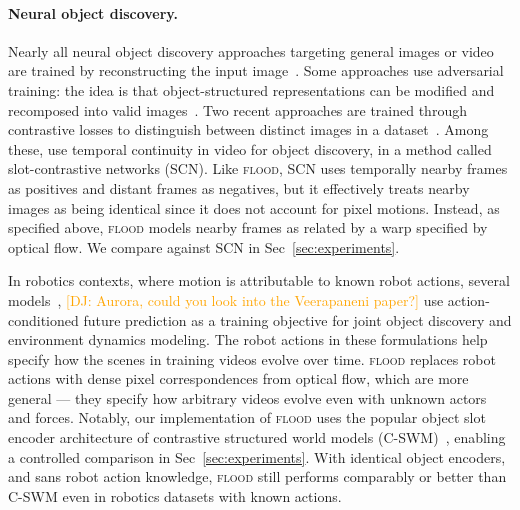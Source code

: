 \documentclass{article}
\newcommand{\jd}[1]{\textcolor{orange}{[DJ: #1]}}
\begin{document}


\paragraph{Neural object discovery.} Nearly all neural object discovery approaches targeting general images or video are trained by reconstructing the input image~\cite{jakab2018unsupervised,jakab2020self,greff2019multi, burgess2019monet,locatello2020object,Kulkarni2019UnsupervisedLO, minderer2019unsupervised, engelcke2019genesis}. Some approaches use adversarial training: the idea is that object-structured representations can be modified and recomposed into valid images~\cite{chen2019unsupervised, yang2020learning}. Two recent approaches are trained through contrastive losses to distinguish between distinct images in a dataset~\cite{racah2020slot,lowe2020learning}. Among these, \citet{racah2020slot} use temporal continuity in video for object discovery, in a method called slot-contrastive networks (SCN). Like \textsc{flood}, SCN uses temporally nearby frames as positives and distant frames as negatives, but it effectively treats nearby images as being identical since it does not account for pixel motions. Instead, as specified above, \textsc{flood} models nearby frames as related by a warp specified by optical flow. We compare against SCN in Sec~\ref{sec:experiments}.  %

In robotics contexts, where motion is attributable to known robot actions, several models~\cite{kipf2019contrastive, kipf2018neural, Veerapaneni2019EntityAI}, \jd{Aurora, could you look into the Veerapaneni paper?} use action-conditioned future prediction as a training objective for joint object discovery and environment dynamics modeling. The robot actions in these formulations help specify how the scenes in training videos evolve over time. \textsc{flood} replaces robot actions with dense pixel correspondences from optical flow, which are more general --- they specify how arbitrary videos evolve even with unknown actors and forces. Notably, our implementation of \textsc{flood} uses the popular object slot encoder architecture of contrastive structured world models (C-SWM)~\cite{kipf2019contrastive}, enabling a controlled comparison in Sec~\ref{sec:experiments}. With identical object encoders, and sans robot action knowledge, \textsc{flood} still performs comparably or better than C-SWM even in robotics datasets with known actions.
\end{document}
